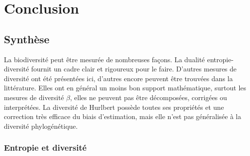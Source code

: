 \documentclass[
  11pt,
  french,
  a4paper,
  extrafontsizes,onecolumn,openright
  ]{memoir}
\begin{document}
\hypertarget{part-conclusion}{%
\part{Conclusion}\label{part-conclusion}}

\hypertarget{sec:conclusionSynthese}{%
\chapter{Synthèse}\label{sec:conclusionSynthese}}

\scriptsize

\normalsize

La biodiversité peut être mesurée de nombreuses façons.
La dualité entropie-diversité fournit un cadre clair et rigoureux pour le faire.
D'autres mesures de diversité ont été présentées ici, d'autres encore peuvent être trouvées dans la littérature.
Elles ont en général un moins bon support mathématique, surtout les mesures de diversité \(\beta\), elles ne peuvent pas être décomposées, corrigées ou interprétées.
La diversité de Hurlbert possède toutes ses propriétés et une correction très efficace du biais d'estimation, mais elle n'est pas généralisée à la diversité phylogénétique.

\hypertarget{entropie-et-diversituxe9-1}{%
\section{Entropie et diversité}\label{entropie-et-diversituxe9-1}}



\scriptsize
\end{document}
